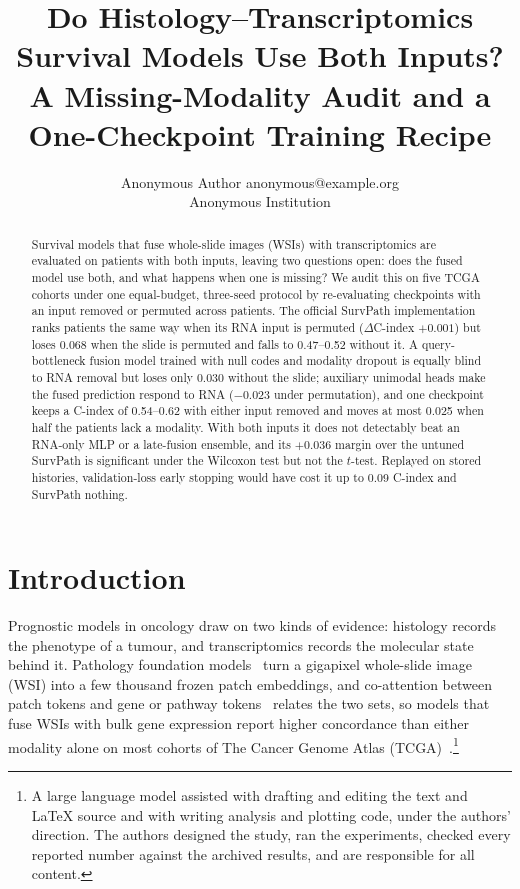 \documentclass{article}
\title{Do Histology--Transcriptomics Survival Models Use Both Inputs? A Missing-Modality Audit and a One-Checkpoint Training Recipe}
\author{\name Anonymous Author \email anonymous@example.org \\
      \addr Anonymous Institution}
\newcommand{\cindex}{C-index}
\begin{document}
\maketitle

\begin{abstract}
Survival models that fuse whole-slide images (WSIs) with transcriptomics are evaluated on patients with both inputs, leaving two questions open: does the fused model use both, and what happens when one is missing? We audit this on five TCGA cohorts under one equal-budget, three-seed protocol by re-evaluating checkpoints with an input removed or permuted across patients. The official SurvPath implementation ranks patients the same way when its RNA input is permuted ($\Delta$\cindex{} $+0.001$) but loses 0.068 when the slide is permuted and falls to 0.47--0.52 without it. A query-bottleneck fusion model trained with null codes and modality dropout is equally blind to RNA removal but loses only 0.030 without the slide; auxiliary unimodal heads make the fused prediction respond to RNA ($-0.023$ under permutation), and one checkpoint keeps a \cindex{} of 0.54--0.62 with either input removed and moves at most 0.025 when half the patients lack a modality. With both inputs it does not detectably beat an RNA-only MLP or a late-fusion ensemble, and its $+0.036$ margin over the untuned SurvPath is significant under the Wilcoxon test but not the $t$-test. Replayed on stored histories, validation-loss early stopping would have cost it up to 0.09 \cindex{} and SurvPath nothing.
\end{abstract}

\section{Introduction}
\label{sec:intro}

Prognostic models in oncology draw on two kinds of evidence: histology records the phenotype of a tumour, and transcriptomics records the molecular state behind it. Pathology foundation models~\citep{chen2024uni,xu2024gigapath,vorontsov2024virchow} turn a gigapixel whole-slide image (WSI) into a few thousand frozen patch embeddings, and co-attention between patch tokens and gene or pathway tokens~\citep{chen2021mcat,jaume2024survpath} relates the two sets, so models that fuse WSIs with bulk gene expression report higher concordance than either modality alone on most cohorts of The Cancer Genome Atlas (TCGA)~\citep{chen2022pancancer,jaume2024survpath,song2024mmp}.\footnote{A large language model assisted with drafting and editing the text and \LaTeX{} source and with writing analysis and plotting code, under the authors' direction. The authors designed the study, ran the experiments, checked every reported number against the archived results, and are responsible for all content.}
\end{document}
